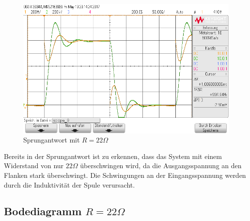 \begin{figure}[H]
  \begin{center}
    \includegraphics[width=1\textwidth]{./Oszi_Bilder/RLC_Sprung_22.png}
    \caption{Sprungantwort mit $R=22\Omega$}
  \end{center}
\end{figure}
\noindent
Bereits in der Sprungantwort ist zu erkennen, dass das System mit einem Widerstand von nur $22\Omega$ \"uberschwingen wird, da die Ausgangsspannung an den Flanken stark \"uberschwingt. Die Schwingungen an der Eingangsspannung werden durch die Induktivität der Spule verursacht.

\subsection{Bodediagramm $R=22\Omega$}

